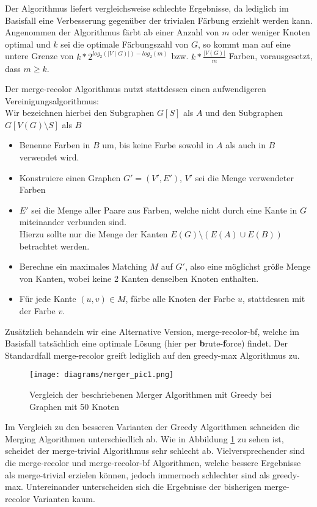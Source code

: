 \documentclass[11pt]{article}
\begin{document}
Der Algorithmus liefert vergleichsweise schlechte Ergebnisse, 
da lediglich im Basisfall eine Verbesserung gegenüber der trivialen Färbung erziehlt werden kann.
Angenommen der Algorithmus färbt ab einer Anzahl von $m$ oder weniger Knoten optimal
und $k$ sei die optimale Färbungszahl von $G$, so kommt man auf eine untere Grenze von 
$k*2^{log_2(|V(G)|)-log_2(m)}$ bzw. $k*\frac{|V(G)|}{m}$ Farben, vorausgesetzt, dass $m\geq k$.\par

Der merge-recolor Algorithmus nutzt stattdessen einen aufwendigeren Vereinigungsalgorithmus:\\
Wir bezeichnen hierbei den Subgraphen $G[S]$ als $A$ und den Subgraphen $G[V(G)\setminus S]$ als $B$
\begin{itemize}
\item[1.] Benenne Farben in $B$ um, bis keine Farbe sowohl in $A$ als auch in $B$ verwendet wird.
\item[2.] Konstruiere einen Graphen $G'=(V',E')$, $V'$ sei die Menge verwendeter Farben
\item[3.] $E'$ sei die Menge aller Paare aus Farben, welche nicht durch eine Kante in $G$ miteinander verbunden sind. \\Hierzu sollte nur die Menge der Kanten $E(G)\setminus (E(A)\cup E(B))$ betrachtet werden.
\item[4.] Berechne ein maximales Matching $M$ auf $G'$, also eine möglichst größe Menge von Kanten, wobei keine 2 Kanten denselben Knoten enthalten.
\item[5.] Für jede Kante $(u,v)\in M$, färbe alle Knoten der Farbe $u$, stattdessen mit der Farbe $v$.
\end{itemize}

Zusätzlich behandeln wir eine Alternative Version, merge-recolor-bf, welche im Basisfall tatsächlich eine optimale Lösung (hier per \textbf{b}rute-\textbf{f}orce) findet.
Der Standardfall merge-recolor greift lediglich auf den greedy-max Algorithmus zu.

\begin{figure}
  \texttt{[image: diagrams/merger\_pic1.png]}
  \caption{Vergleich der beschriebenen Merger Algorithmen mit Greedy bei Graphen mit 50 Knoten}
  \label{fig:merge1}
\end{figure}

Im Vergleich zu den besseren Varianten der Greedy Algorithmen schneiden die Merging Algorithmen unterschiedlich ab. Wie in Abbildung \ref{fig:merge1} zu sehen ist, scheidet der merge-trivial Algorithmus sehr schlecht ab.
Vielversprechender sind die merge-recolor und merge-recolor-bf Algorithmen, welche bessere Ergebnisse als merge-trivial erzielen können, jedoch immernoch schlechter sind als greedy-max. Untereinander unterscheiden sich die Ergebnisse der bisherigen merge-recolor Varianten kaum.
\end{document}
